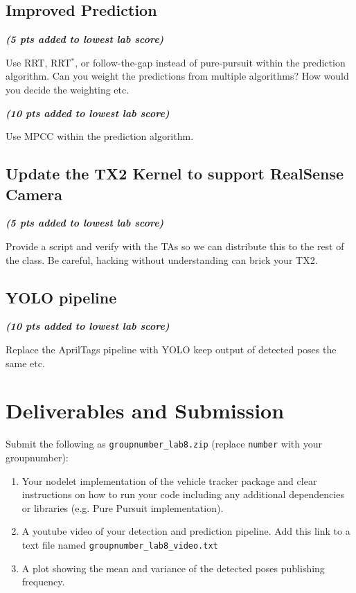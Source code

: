 \documentclass[letta4 paper]{article}
\numberwithin{equation}{section}
\newcommand{\0}{\mathbf{0}}
\begin{document}
	\subsection{Improved Prediction} \textit{\textbf{(5 pts added to lowest lab score)}}
	
	\noindent Use RRT, RRT$^{*}$, or follow-the-gap instead of pure-pursuit within the prediction algorithm. Can you weight the predictions from multiple algorithms? How would you decide the weighting etc. 
	\newline
	
	\noindent\textit{\textbf{(10 pts added to lowest lab score)}}
	
	\noindent Use MPCC within the prediction algorithm. 
	
	\subsection{Update the TX2 Kernel to support RealSense Camera} \textit{\textbf{(5 pts added to lowest lab score)}}
	
	\noindent Provide a script and verify with the TAs so we can distribute this to the rest of the class. Be careful, hacking without understanding can brick your TX2. 
	
	\subsection{YOLO pipeline}\textit{\textbf{(10 pts added to lowest lab score)}}
	
	\noindent Replace the AprilTags pipeline with YOLO keep output of detected poses the same etc. 


	\section{Deliverables and Submission}
	Submit the following as \texttt{groupnumber\_lab8.zip} (replace \texttt{number} with your groupnumber):
	

	\begin{enumerate}
		\item Your nodelet implementation of the vehicle tracker package and clear instructions on how to run your code including any additional dependencies or libraries (e.g. Pure Pursuit implementation).
		\item A youtube video of your detection and prediction pipeline. Add this link to a text file named \texttt{groupnumber\_lab8\_video.txt}
		\item A plot showing the mean and variance of the detected poses publishing frequency.
	\end{enumerate}
\end{document}

